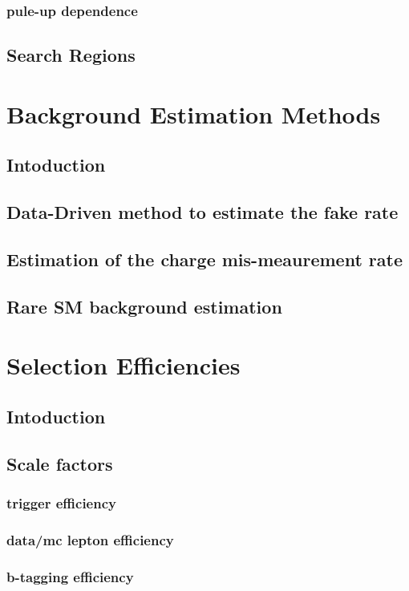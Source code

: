 \subsection{pule-up dependence}
\section{Search Regions}

\chapter{Background Estimation Methods}
\section{Intoduction}
\section{Data-Driven method to estimate the fake rate}
\section{Estimation of the charge mis-meaurement rate}
\section{Rare SM background estimation}

\chapter{Selection Efficiencies}
\section{Intoduction}
\section{Scale factors}
\subsection{trigger efficiency}
\subsection{data/mc lepton efficiency}
\subsection{b-tagging efficiency}
